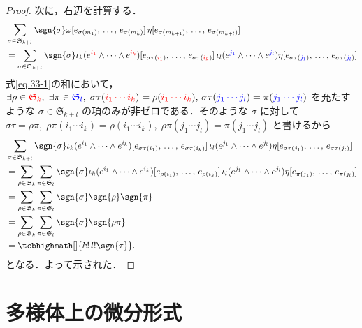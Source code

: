 \documentclass[geometry_main]{subfiles}
\begin{document}
\begin{proof}
	次に，右辺を計算する．
	\begin{align} 
		&\sum_{\sigma \in \mathfrak{S}_{k+l}} \sgn{\sigma} \omega[e_{\sigma(m_1)},\, \dots ,\, e_{\sigma(m_{k})}] \, \eta[e_{\sigma(m_{k+1})},\, \dots ,\, e_{\sigma(m_{k+l})}] \\
		&= \sum_{\sigma \in \mathfrak{S}_{k+l}} \sgn{\sigma} \iota_k(e^{\textcolor{red}{i_1}} \wedge \cdots \wedge e^{\textcolor{red}{i_k}})[e_{\sigma\tau(\textcolor{red}{i_1})},\, \dots ,\, e_{\sigma\tau(\textcolor{red}{i_{k}})}]\, \iota_l (e^{\textcolor{blue}{j_1}} \wedge \cdots \wedge e^{\textcolor{blue}{j_{l}}})\eta[e_{\sigma\tau(\textcolor{blue}{j_{1}})},\, \dots ,\, e_{\sigma\tau(\textcolor{blue}{j_{l}})}] \label{eq.33-1}\\
	\end{align}
	式\eqref{eq.33-1}の和において，$\exists \rho \in \textcolor{red}{\mathfrak{S}_k},\; \exists \pi \in \textcolor{blue}{\mathfrak{S}_l},\; \sigma\tau(\textcolor{red}{i_1 \cdots i_k}) = \rho(\textcolor{red}{i_1 \cdots i_k}),\, \sigma\tau(\textcolor{blue}{j_1 \cdots j_l}) = \pi(\textcolor{blue}{j_1 \cdots j_l})$ を充たすような $\sigma \in \mathfrak{S}_{k+l}$ の項のみが非ゼロである．そのような $\sigma$ に対して $\sigma\tau = \rho\pi,\; \rho\pi(i_1 \cdots i_k) = \rho(i_1 \cdots i_k),\; \rho\pi(j_1 \cdots j_l) = \pi(j_1 \cdots j_l)$ と書けるから
	\begin{align} 
		&\sum_{\sigma \in \mathfrak{S}_{k+l}} \sgn{\sigma} \iota_k(e^{i_1} \wedge \cdots \wedge e^{i_k})[e_{\sigma\tau(i_1)},\, \dots ,\, e_{\sigma\tau(i_{k})}]\, \iota_l (e^{j_1} \wedge \cdots \wedge e^{j_{l}})\eta[e_{\sigma\tau(j_{1})},\, \dots ,\, e_{\sigma\tau(j_{l})}] \\
		&= \sum_{\rho \in \mathfrak{S}_{k}} \sum_{\pi \in \mathfrak{S}_{l}} \sgn{\sigma} \iota_k(e^{i_1} \wedge \cdots \wedge e^{i_k})[e_{\rho(i_1)},\, \dots ,\, e_{\rho(i_{k})}]\, \iota_l (e^{j_1} \wedge \cdots \wedge e^{j_{l}})\eta[e_{\pi(j_{1})},\, \dots ,\, e_{\pi(j_{l})}] \\
		&= \sum_{\rho \in \mathfrak{S}_{k}} \sum_{\pi \in \mathfrak{S}_{l}} \sgn{\sigma} \sgn{\rho} \sgn{\pi} \\
		&= \sum_{\rho \in \mathfrak{S}_{k}} \sum_{\pi \in \mathfrak{S}_{l}} \sgn{\sigma} \sgn{\rho\pi} \\
		&= \tcbhighmath[]{k!\, l! \sgn{\tau}}.
	\end{align}
	となる．よって示された．
\end{proof}

\section{\cinfty 多様体上の微分形式}
\end{document}
